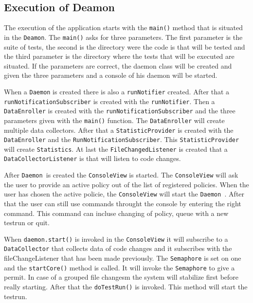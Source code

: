 \documentclass[i2]{oss}
\newcommand{\class}[1]{\texttt{#1}}
\newcommand{\method}[1]{\texttt{#1}}
\newcommand{\Deamon}{\class{Daemon  }}
\begin{document}
\subsection{Execution of Deamon}

The execution of the application starts with the \method{main()} method that is situated in the \class{Deamon}. The \method{main()} asks for three parameters. The first parameter is the suite of tests, the second is the directory were the code is that will be tested and the third parameter is the directory where the tests that will be executed are situated. If the parameters are correct, the daemon class will be created and given the three parameters and a console of his daemon will be started.  

When a \class{Daemon} is created there is also a \class{runNotifier} created. After that a \class{runNotificationSubscriber} is created with the \class{runNotifier}. Then a \class{DataEnroller} is created with the \class{runNotificationSubscriber} and the three parameters given with the \method{main()} function. The \class{DataEnroller} will create multiple data collectors. After that a \class{StatisticProvider} is created with the \class{DataEnroller} and the \class{RunNotificationSubscriber}. This \class{StatisticProvider} will create \class{Statistics}. At last the \class{FileChangedListener} is created that a \class{DataCollectorListener} is that will listen to  code changes.

After \Deamon is created the \class{ConsoleView} is started. The \class{ConsoleView} will ask the user to provide an active policy out of the list of registered policies. When the user has chosen the active policie, the \class{ConsoleView} will start the \Deamon. After that the user can still use commands throught the console by entering the right command. This command can incluse changing of policy, queue with a new testrun or quit. 

When \method{daemon.start()} is invoked in the \class{ConsoleView} it will subscribe to a \class{DataCollector} that collects data of code changes and it subscribes with the fileChangeListener that has been made previously. The \class{Semaphore} is set on one and the \method{startCore()} method is called. It will invoke the \class{Semaphore} to give a permit. In case of a grouped file changesm the system will stabilize first before really starting. After that the \method{doTestRun()} is invoked. This method will start the testrun.
\end{document}
